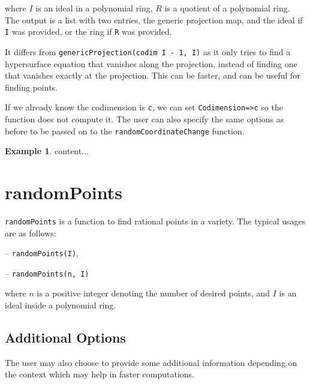 \documentclass[11pt]{amsart}
\theoremstyle{definition}
\newtheorem{example}{Example}[section]
\begin{document}
\begin{enumerate}
\vspace{1em}
\noindent where $I$ is an ideal in a polynomial ring, $R$ is a quotient of a polynomial ring. The output is
a list with two entries, the generic projection map, and the ideal if {\tt I} was provided, or the ring if {\tt R} was provided.

It differs from {\tt genericProjection(codim I - 1, I)} as it only tries to find a hypersurface equation that vanishes along the projection, instead of finding one that vanishes exactly at the projection.  This can be faster, and can be useful for finding points. 

If we already know the codimension is {\tt c}, we can set {\tt Codimension=>c} so the function does not compute it. The user can also specify the same options as before to be passed on to the {\tt randomCoordinateChange} function.

\begin{example}
	content...
\end{example}
\end{enumerate}
\section{randomPoints}\label{randomPoints}
{\tt randomPoints} is a function to find rational points in a variety. The typical usages are as follows: 

\vspace{1em}
-- {\tt randomPoints(I)}, 

-- {\tt randomPoints(n, I)} 

\vspace{1em}
\noindent where $n$ is a positive integer denoting the number of desired points, and 
$I$ is an ideal inside a polynomial ring.


\subsection{Additional Options}\label{strategydetails}

The user may also choose to provide some additional information depending on the context which may help in faster computations. 
\end{document}

